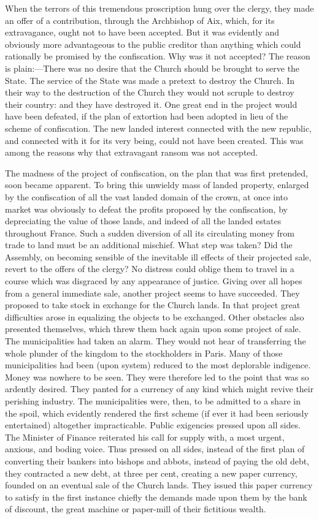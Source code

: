 When the terrors of this tremendous proscription hung over the clergy, they made an offer of a contribution, through the Archbishop of Aix, which, for its extravagance, ought not to have been accepted. But it was evidently and obviously more advantageous to the public creditor than anything which could rationally be promised by the confiscation. Why was it not accepted? The reason is plain:—There was no desire that the Church should be brought to serve the State. The service of the State was made a pretext to destroy the Church. In their way to the destruction of the Church they would not scruple to destroy their country: and they have destroyed it. One great end in the project would have been defeated, if the plan of extortion had been adopted in lieu of the scheme of confiscation. The new landed interest connected with the new republic, and connected with it for its very being, could not have been created. This was among the reasons why that extravagant ransom was not accepted.

The madness of the project of confiscation, on the plan that was first pretended, soon became apparent. To bring this unwieldy mass of landed property, enlarged by the confiscation of all the vast landed domain of the crown, at once into market was obviously to defeat the profits proposed by the confiscation, by depreciating the value of those lands, and indeed of all the landed estates throughout France. Such a sudden diversion of all its circulating money from trade to land must be an additional mischief. What step was taken? Did the Assembly, on becoming sensible of the inevitable ill effects of their projected sale, revert to the offers of the clergy? No distress could oblige them to travel in a course which was disgraced by any appearance of justice. Giving over all hopes from a general immediate sale, another project seems to have succeeded. They proposed to take stock in exchange for the Church lands. In that project great difficulties arose in equalizing the objects to be exchanged. Other obstacles also presented themselves, which threw them back again upon some project of sale. The municipalities had taken an alarm. They would not hear of transferring the whole plunder of the kingdom to the stockholders in Paris. Many of those municipalities had been (upon system) reduced to the most deplorable indigence. Money was nowhere to be seen. They were therefore led to the point that was so ardently desired. They panted for a currency of any kind which might revive their perishing industry. The municipalities were, then, to be admitted to a share in the spoil, which evidently rendered the first scheme (if ever it had been seriously entertained) altogether impracticable. Public exigencies pressed upon all sides. The Minister of Finance reiterated his call for supply with, a most urgent, anxious, and boding voice. Thus pressed on all sides, instead of the first plan of converting their bankers into bishops and abbots, instead of paying the old debt, they contracted a new debt, at three per cent, creating a new paper currency, founded on an eventual sale of the Church lands. They issued this paper currency to satisfy in the first instance chiefly the demands made upon them by the bank of discount, the great machine or paper-mill of their fictitious wealth.

